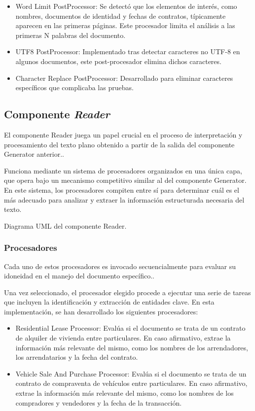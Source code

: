 \begin{itemize}
    \item
    Word Limit PostProcessor: Se detectó que los elementos de interés, como nombres, documentos de identidad y fechas de
    contratos, típicamente aparecen en las primeras páginas. Este procesador limita el análisis a las primeras N
    palabras del documento.
    \item UTF8 PostProcessor: Implementado tras detectar caracteres no UTF-8 en algunos documentos, este post-procesador
    elimina dichos caracteres.
    \item Character Replace PostProcessor: Desarrollado para eliminar caracteres específicos que complicaba las pruebas.
\end{itemize}



\subsection*{Componente \textit{Reader}}\label{subsec:chapter_4.reader_component}
El componente Reader juega un papel crucial en el proceso de interpretación y procesamiento del texto plano obtenido a
partir de la salida del componente Generator anterior..

Funciona mediante un sistema de procesadores organizados en una única capa, que opera bajo un mecanismo competitivo
similar al del componente Generator. En este sistema, los procesadores compiten entre sí para determinar cuál es el más
adecuado para analizar y extraer la información estructurada necesaria del texto.

Diagrama UML del componente Reader.

\subsubsection*{Procesadores}
Cada uno de estos procesadores es invocado secuencialmente para evaluar su idoneidad en el manejo del documento
específico..

Una vez seleccionado, el procesador elegido procede a ejecutar una serie de tareas que incluyen la identificación y
extracción de entidades clave. En esta implementación, se han desarrollado los siguientes procesadores:

\begin{itemize}
    \item Residential Lease Processor: Evalúa si el documento se trata de un contrato de alquiler de vivienda entre
    particulares. En caso afirmativo, extrae la información más relevante del mismo, como los nombres de los
    arrendadores, los arrendatarios y la fecha del contrato.
    \item Vehicle Sale And Purchase Processor: Evalúa si el documento se trata de un contrato de compraventa de
    vehículos
    entre particulares. En caso afirmativo, extrae la información más relevante del mismo, como los nombres de los
    compradores y vendedores y la fecha de la transacción.
\end{itemize}

